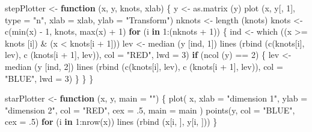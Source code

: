 \documentclass[
  12pt,
]{book}
\newenvironment{Shaded}{\begin{snugshade}}{\end{snugshade}}
\newcommand{\AttributeTok}[1]{\textcolor[rgb]{0.77,0.63,0.00}{#1}}
\newcommand{\ControlFlowTok}[1]{\textcolor[rgb]{0.13,0.29,0.53}{\textbf{#1}}}
\newcommand{\DecValTok}[1]{\textcolor[rgb]{0.00,0.00,0.81}{#1}}
\newcommand{\FunctionTok}[1]{\textcolor[rgb]{0.00,0.00,0.00}{#1}}
\newcommand{\NormalTok}[1]{#1}
\newcommand{\OtherTok}[1]{\textcolor[rgb]{0.56,0.35,0.01}{#1}}
\newcommand{\SpecialCharTok}[1]{\textcolor[rgb]{0.00,0.00,0.00}{#1}}
\newcommand{\StringTok}[1]{\textcolor[rgb]{0.31,0.60,0.02}{#1}}
\begin{document}
\begin{Shaded}
\begin{Highlighting}[]
\NormalTok{stepPlotter }\OtherTok{\textless{}{-}} \ControlFlowTok{function}\NormalTok{ (x, y, knots, xlab) \{}
\NormalTok{  y }\OtherTok{\textless{}{-}} \FunctionTok{as.matrix}\NormalTok{ (y)}
  \FunctionTok{plot}\NormalTok{ (x,}
\NormalTok{        y[, }\DecValTok{1}\NormalTok{],}
        \AttributeTok{type =} \StringTok{"n"}\NormalTok{,}
        \AttributeTok{xlab =}\NormalTok{ xlab,}
        \AttributeTok{ylab =} \StringTok{"Transform"}\NormalTok{)}
\NormalTok{  nknots }\OtherTok{\textless{}{-}} \FunctionTok{length}\NormalTok{ (knots)}
\NormalTok{  knots }\OtherTok{\textless{}{-}} \FunctionTok{c}\NormalTok{(}\FunctionTok{min}\NormalTok{(x) }\SpecialCharTok{{-}} \DecValTok{1}\NormalTok{, knots, }\FunctionTok{max}\NormalTok{(x) }\SpecialCharTok{+} \DecValTok{1}\NormalTok{)}
  \ControlFlowTok{for}\NormalTok{ (i }\ControlFlowTok{in} \DecValTok{1}\SpecialCharTok{:}\NormalTok{(nknots }\SpecialCharTok{+} \DecValTok{1}\NormalTok{)) \{}
\NormalTok{    ind }\OtherTok{\textless{}{-}} \FunctionTok{which}\NormalTok{ ((x }\SpecialCharTok{\textgreater{}=}\NormalTok{ knots [i]) }\SpecialCharTok{\&}\NormalTok{ (x }\SpecialCharTok{\textless{}}\NormalTok{ knots[i }\SpecialCharTok{+} \DecValTok{1}\NormalTok{]))}
\NormalTok{    lev }\OtherTok{\textless{}{-}} \FunctionTok{median}\NormalTok{ (y [ind, }\DecValTok{1}\NormalTok{])}
    \FunctionTok{lines}\NormalTok{ (}\FunctionTok{rbind}\NormalTok{ (}\FunctionTok{c}\NormalTok{(knots[i], lev), }\FunctionTok{c}\NormalTok{ (knots[i }\SpecialCharTok{+} \DecValTok{1}\NormalTok{], lev)), }\AttributeTok{col =} \StringTok{"RED"}\NormalTok{, }\AttributeTok{lwd =} \DecValTok{3}\NormalTok{)}
    \ControlFlowTok{if}\NormalTok{ (}\FunctionTok{ncol}\NormalTok{ (y) }\SpecialCharTok{==} \DecValTok{2}\NormalTok{) \{}
\NormalTok{      lev }\OtherTok{\textless{}{-}} \FunctionTok{median}\NormalTok{ (y [ind, }\DecValTok{2}\NormalTok{])}
      \FunctionTok{lines}\NormalTok{ (}\FunctionTok{rbind}\NormalTok{ (}\FunctionTok{c}\NormalTok{(knots[i], lev), }\FunctionTok{c}\NormalTok{ (knots[i }\SpecialCharTok{+} \DecValTok{1}\NormalTok{], lev)), }\AttributeTok{col =} \StringTok{"BLUE"}\NormalTok{, }\AttributeTok{lwd =} \DecValTok{3}\NormalTok{)}
\NormalTok{    \}}
\NormalTok{  \}}
\NormalTok{\}}

\NormalTok{starPlotter }\OtherTok{\textless{}{-}} \ControlFlowTok{function}\NormalTok{ (x, y, }\AttributeTok{main =} \StringTok{""}\NormalTok{) \{}
  \FunctionTok{plot}\NormalTok{(}
\NormalTok{    x,}
    \AttributeTok{xlab =} \StringTok{"dimension 1"}\NormalTok{,}
    \AttributeTok{ylab =} \StringTok{"dimension 2"}\NormalTok{,}
    \AttributeTok{col =} \StringTok{"RED"}\NormalTok{,}
    \AttributeTok{cex =}\NormalTok{ .}\DecValTok{5}\NormalTok{,}
    \AttributeTok{main =}\NormalTok{ main}
\NormalTok{  )}
  \FunctionTok{points}\NormalTok{(y, }\AttributeTok{col =} \StringTok{"BLUE"}\NormalTok{, }\AttributeTok{cex =}\NormalTok{ .}\DecValTok{5}\NormalTok{)}
  \ControlFlowTok{for}\NormalTok{ (i }\ControlFlowTok{in} \DecValTok{1}\SpecialCharTok{:}\FunctionTok{nrow}\NormalTok{(x))}
    \FunctionTok{lines}\NormalTok{ (}\FunctionTok{rbind}\NormalTok{ (x[i, ], y[i, ]))}
\NormalTok{\}}


\end{Highlighting}
\end{Shaded}
\end{document}

